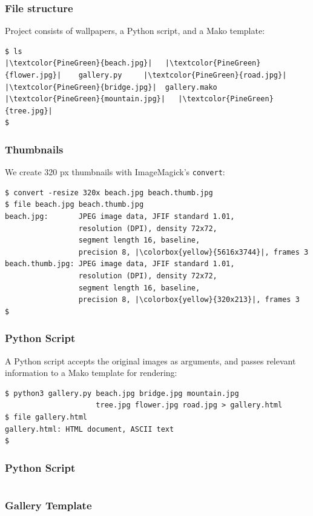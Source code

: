 \documentclass[xcolor=dvipsnames,t,compress]{beamer}
\begin{document}
\begin{frame}[fragile]
\frametitle{File structure}
Project consists of wallpapers, a Python script, and a Mako template:
\\
\begin{verbatim}
$ ls
|\textcolor{PineGreen}{beach.jpg}|   |\textcolor{PineGreen}{flower.jpg}|    gallery.py     |\textcolor{PineGreen}{road.jpg}|
|\textcolor{PineGreen}{bridge.jpg}|  gallery.mako  |\textcolor{PineGreen}{mountain.jpg}|   |\textcolor{PineGreen}{tree.jpg}|
$
\end{verbatim}
\end{frame}

\begin{frame}[fragile]
\frametitle{Thumbnails}
We create 320 px thumbnails with ImageMagick's \texttt{convert}:
\\
\begin{verbatim}
$ convert -resize 320x beach.jpg beach.thumb.jpg
$ file beach.jpg beach.thumb.jpg
beach.jpg:       JPEG image data, JFIF standard 1.01,
                 resolution (DPI), density 72x72,
                 segment length 16, baseline,
                 precision 8, |\colorbox{yellow}{5616x3744}|, frames 3
beach.thumb.jpg: JPEG image data, JFIF standard 1.01,
                 resolution (DPI), density 72x72,
                 segment length 16, baseline,
                 precision 8, |\colorbox{yellow}{320x213}|, frames 3
$
\end{verbatim}
\end{frame}

\begin{frame}[fragile]
\frametitle{Python Script}
A Python script accepts the original images as arguments, and passes relevant information to a Mako template for rendering:
\\
\begin{verbatim}
$ python3 gallery.py beach.jpg bridge.jpg mountain.jpg
                     tree.jpg flower.jpg road.jpg > gallery.html
$ file gallery.html
gallery.html: HTML document, ASCII text
$
\end{verbatim}
\end{frame}

\begin{frame}[fragile]
\frametitle{Python Script}
\vspace{-1em}
\inputminted{py}{examples/script/gallery.py}
\end{frame}

\begin{frame}[fragile]
\frametitle{Gallery Template}
\vspace{-1em}
\inputminted{html}{examples/script/gallery.mako}
\end{frame}
\end{document}
